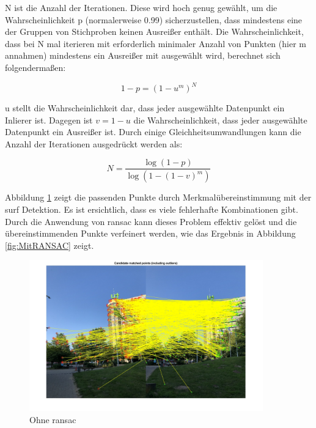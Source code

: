 N ist die Anzahl der Iterationen. Diese wird hoch genug gewählt, um die Wahrscheinlichkeit p (normalerweise 0.99) sicherzustellen, dass mindestens eine der Gruppen von Stichproben keinen Ausreißer enthält. Die Wahrscheinlichkeit, dass bei N mal iterieren mit erforderlich minimaler Anzahl von Punkten (hier m annahmen) mindestens ein Ausreißer mit ausgewählt wird, berechnet sich folgendermaßen:

\begin{equation}
   1 - p = (1 - u^m)^N
\end{equation}

u stellt die Wahrscheinlichkeit dar, dass jeder ausgewählte Datenpunkt ein Inlierer ist. Dagegen ist $v=1-u$ die Wahrscheinlichkeit, dass jeder ausgewählte Datenpunkt ein Ausreißer ist. Durch einige Gleichheitsumwandlungen kann die Anzahl der Iterationen ausgedrückt werden als:

\begin{equation}
   N = \frac{\log(1 - p)}{\log(1 - (1 - v)^m)}
\end{equation}

Abbildung \ref{fig:OhneRANSAC} zeigt die passenden Punkte durch Merkmalübereinstimmung mit der \gls{surf} Detektion. Es ist ersichtlich, dass es viele fehlerhafte Kombinationen gibt. Durch die Anwendung von \gls{ransac} kann dieses Problem effektiv gelöst und die übereinstimmenden Punkte verfeinert werden, wie das Ergebnis in Abbildung \ref{fig:MitRANSAC} zeigt.

\begin{figure}[H]
 \centering 
 \includegraphics[keepaspectratio,width=0.9\textwidth]{images/3_Ersteverfahren/RANSAC/OhneRANSAC.pdf}
 \caption{Ohne \gls{ransac}}
 \label{fig:OhneRANSAC}
\end{figure} 

